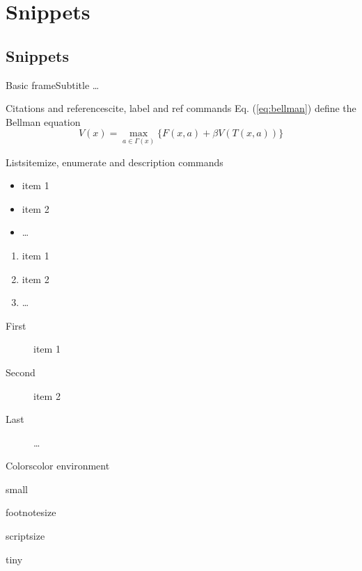 \section{Snippets}

\subsection{Snippets}

\begin{frame}{Basic frame}{Subtitle}
    \dots
\end{frame}

\begin{frame}{Citations and references}{cite, label and ref commands}
    Eq. (\ref{eq:bellman}) define the Bellman equation \cite{bellman1956dynamic}
    \begin{equation}
        V(x) = \max_{a \in \Gamma (x) } \{ F(x,a) + \beta V(T(x,a)) \}  \label{eq:bellman}
    \end{equation}
\end{frame}
\note{
}


\begin{frame}{Lists}{itemize, enumerate and description commands}
    \begin{itemize}
        \item item 1
        \item item 2
        \item \dots
    \end{itemize}

    \begin{enumerate}
        \item item 1
        \item item 2
        \item \dots
    \end{enumerate}

    \begin{description}
        \item[First] item 1
        \item[Second] item 2
        \item[Last] \dots
    \end{description}
\end{frame}
\note{
}


\begin{frame}{Colors}{color environment}
    \begin{small}
    small
    \end{small}

    \begin{footnotesize}
    footnotesize
    \end{footnotesize}

    \begin{scriptsize}
    scriptsize
    \end{scriptsize}

    \begin{tiny}
    tiny
    \end{tiny}
\end{frame}
\note{
}



